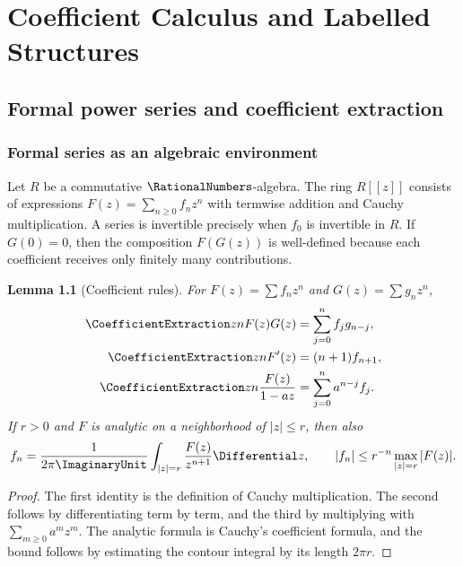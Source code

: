 \documentclass[11pt,a4paper,oneside,openany]{book}
\newtheorem{lemma}[theorem]{Lemma}
\theoremstyle{definition}
\theoremstyle{remark}
\begin{document}
\mainmatter

\part{Coefficient Calculus and Labelled Structures}

\chapter{Formal power series and coefficient extraction}
\label{ch:formal}

\section{Formal series as an algebraic environment}
Let $R$ be a commutative $\RationalNumbers$-algebra.  The ring $R[[z]]$ consists of expressions
$F(z)=\sum_{n\ge0}f_nz^n$ with termwise addition and Cauchy multiplication.  A series
is invertible precisely when $f_0$ is invertible in $R$.  If $G(0)=0$, then the
composition $F(G(z))$ is well-defined because each coefficient receives only
finitely many contributions.

\begin{lemma}[Coefficient rules]\label{lem:coeff-rules}
For $F(z)=\sum f_nz^n$ and $G(z)=\sum g_nz^n$,
\begin{align}
 \CoefficientExtraction z n F(z)G(z)&=\sum_{j=0}^n f_jg_{n-j},\label{eq:cauchy}\\
 \CoefficientExtraction z n F'(z)&=(n+1)f_{n+1},\label{eq:der-coeff}\\
 \CoefficientExtraction z n \frac{F(z)}{1-az}&=\sum_{j=0}^n a^{n-j}f_j.\label{eq:geom-conv}
\end{align}
If $r>0$ and $F$ is analytic on a neighborhood of $|z|\le r$, then also
\begin{equation}\label{eq:cauchy-coeff}
 f_n=\frac{1}{2\pi \ImaginaryUnit}\int_{|z|=r}\frac{F(z)}{z^{n+1}}\Differential z,
 \qquad |f_n|\le r^{-n}\max_{|z|=r}|F(z)|.
\end{equation}
\end{lemma}
\begin{proof}
The first identity is the definition of Cauchy multiplication.  The second follows
by differentiating term by term, and the third by multiplying with
$\sum_{m\ge0}a^mz^m$.  The analytic formula is Cauchy's coefficient formula, and the
bound follows by estimating the contour integral by its length $2\pi r$.
\end{proof}
\end{document}
